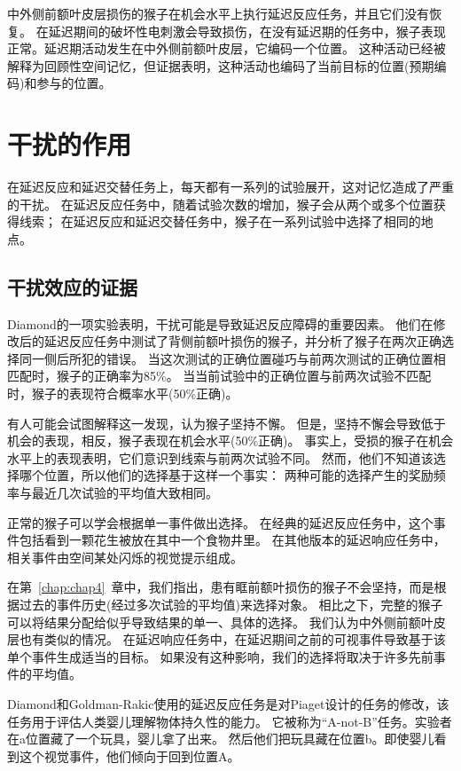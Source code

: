 中外侧前额叶皮层损伤的猴子在机会水平上执行延迟反应任务，并且它们没有恢复。
在延迟期间的破坏性电刺激会导致损伤，在没有延迟期的任务中，猴子表现正常。延迟期活动发生在中外侧前额叶皮层，它编码一个位置。
这种活动已经被解释为回顾性空间记忆，但证据表明，这种活动也编码了当前目标的位置(预期编码)和参与的位置。



\section{干扰的作用}

在延迟反应和延迟交替任务上，每天都有一系列的试验展开，这对记忆造成了严重的干扰。
在延迟反应任务中，随着试验次数的增加，猴子会从两个或多个位置获得线索；
在延迟反应和延迟交替任务中，猴子在一系列试验中选择了相同的地点。



\subsection{干扰效应的证据}

Diamond\cite{diamond1989comparison}的一项实验表明，干扰可能是导致延迟反应障碍的重要因素。
他们在修改后的延迟反应任务中测试了背侧前额叶损伤的猴子，并分析了猴子在两次正确选择同一侧后所犯的错误。
当这次测试的正确位置碰巧与前两次测试的正确位置相匹配时，猴子的正确率为85\%。
当当前试验中的正确位置与前两次试验不匹配时，猴子的表现符合概率水平(50\%正确)。


有人可能会试图解释这一发现，认为猴子坚持不懈。
但是，坚持不懈会导致低于机会的表现，相反，猴子表现在机会水平(50\%正确)。
事实上，受损的猴子在机会水平上的表现表明，它们意识到线索与前两次试验不同。
然而，他们不知道该选择哪个位置，所以他们的选择基于这样一个事实：
两种可能的选择产生的奖励频率与最近几次试验的平均值大致相同。


正常的猴子可以学会根据单一事件做出选择。
在经典的延迟反应任务中，这个事件包括看到一颗花生被放在其中一个食物井里。
在其他版本的延迟响应任务中，相关事件由空间某处闪烁的视觉提示组成。


在第~\ref{chap:chap4}~章中，我们指出，患有眶前额叶损伤的猴子不会坚持，而是根据过去的事件历史(经过多次试验的平均值)来选择对象。
相比之下，完整的猴子可以将结果分配给似乎导致结果的单一、具体的选择。
我们认为中外侧前额叶皮层也有类似的情况。
在延迟响应任务中，在延迟期间之前的可视事件导致基于该单个事件生成适当的目标。
如果没有这种影响，我们的选择将取决于许多先前事件的平均值。


Diamond和Goldman-Rakic使用的延迟反应任务是对Piaget\cite{piaget1955construction}设计的任务的修改，该任务用于评估人类婴儿理解物体持久性的能力。
它被称为“A-not-B”任务。实验者在a位置藏了一个玩具，婴儿拿了出来。
然后他们把玩具藏在位置b。即使婴儿看到这个视觉事件，他们倾向于回到位置A\cite{harris1989object}。



